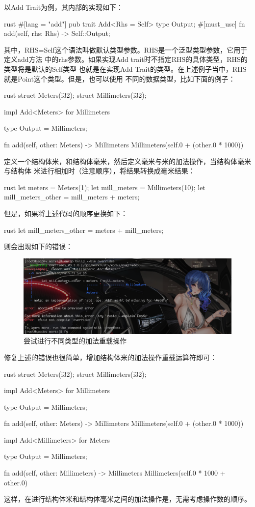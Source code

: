 以Add Trait为例，其内部的实现如下：
\begin{code-block}{rust}
#[lang = "add"]
pub trait Add<Rhs = Self> {
    type Output;
    #[must_use]
    fn add(self, rhs: Rhs) -> Self::Output;
}
\end{code-block}
其中，RHS=Self这个语法叫做默认类型参数。RHS是一个泛型类型参数，它用于定义add方法
中的rhs参数。如果实现Add trait时不指定RHS的具体类型，RHS的类型将是默认的Self类型
也就是在实现Add Trait的类型。在上述例子当中，RHS就是Point这个类型。但是，也可以使用
不同的数据类型，比如下面的例子：
\begin{code-block}{rust}
struct Meters(i32);
struct Millimeters(i32);

impl Add<Meters> for Millimeters {
    type Output = Millimeters;

    fn add(self, other: Meters) -> Millimeters {
        Millimeters(self.0 + (other.0 * 1000))
    }
}
\end{code-block}
定义一个结构体米，和结构体毫米，然后定义毫米与米的加法操作，当结构体毫米与结构体
米进行相加时（注意顺序），将结果转换成毫米结果：
\begin{code-block}{rust}
let meters = Meters(1);
let mill_meters = Millimeters(10);
let mill_meters_other = mill_meters + meters;
\end{code-block}
但是，如果将上述代码的顺序更换如下：
\begin{code-block}{rust}
let mill_meters_other = meters + mill_meters;
\end{code-block}
则会出现如下的错误：
\begin{figure}[H]
  \centering
  \includegraphics[width=\linewidth]{rust_override_error.png}
  \caption{尝试进行不同类型的加法重载操作}
  \label{fig:rust_override_error}
\end{figure}
修复上述的错误也很简单，增加结构体米的加法操作重载运算符即可：
\begin{code-block}{rust}
struct Meters(i32);
struct Millimeters(i32);

impl Add<Meters> for Millimeters {
    type Output = Millimeters;

    fn add(self, other: Meters) -> Millimeters {
        Millimeters(self.0 + (other.0 * 1000))
    }
}

impl Add<Millimeters> for Meters {
    type Output = Millimeters;

    fn add(self, other: Millimeters) -> Millimeters {
        Millimeters(self.0 * 1000 + other.0)
    }
}
\end{code-block}
这样，在进行结构体米和结构体毫米之间的加法操作是，无需考虑操作数的顺序。

